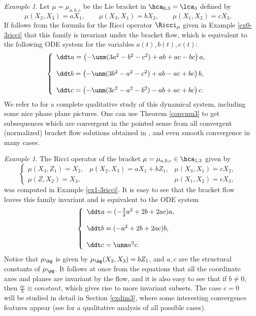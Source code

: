 \documentclass[11pt]{amsart}
\theoremstyle{plain}
\theoremstyle{definition}
\theoremstyle{remark}
\newtheorem{example}[theorem]{Example}
\begin{document}
\begin{example}\label{ex0-3BF}
Let $\mu=\mu_{a,b,c}$ be the Lie bracket in $\hca_{0,3}=\lca_3$ defined by
$$
\mu(X_2,X_3)=aX_1, \qquad \mu(X_3,X_1)=bX_2, \qquad \mu(X_1,X_2)=cX_3.
$$
If follows from the formula for the Ricci operator $\Ricci_\mu$ given in Example \ref{ex0-3ricci} that this family is invariant under the bracket flow, which is equivalent to the following ODE system for the variables $a(t),b(t),c(t)$:
$$
\left\{\begin{array}{l}
\ddt a= \left(-\unm(3a^2-b^2-c^2)+ab+ac-bc\right)a, \\ \\
\ddt b= \left(-\unm(3b^2-a^2-c^2)+ab-ac+bc\right)b,  \\ \\
\ddt c= \left(-\unm(3c^2-a^2-b^2)-ab+ac+bc\right)c.
\end{array}\right.
$$
We refer to \cite{GlcPyn} for a complete qualitative study of this dynamical system, including some nice phase plane pictures.  One can use Theorem \ref{convmu3} to get  subsequences which are convergent in the pointed sense from all convergent (normalized) bracket flow solutions obtained in \cite{GlcPyn}, and even smooth convergence in many cases.
\end{example}



\begin{example}\label{ex1-3BF}
The Ricci operator of the bracket $\mu=\mu_{a,b,c}\in\hca_{1,3}$ given by
$$
\left\{\begin{array}{lll}
\mu(X_3,Z_1)=X_2, & \mu(X_2,X_3)=aX_1+bZ_1, & \mu(X_3,X_1)=cX_2, \\
\mu(Z,X_2)=X_3, &                           & \mu(X_1,X_2)=cX_3,
\end{array}\right.
$$
was computed in Example \ref{ex1-3ricci}.  It is easy to see that the bracket flow leaves this family invariant and is equivalent to the ODE system
$$
\left\{\begin{array}{l}
\ddt a=(-\tfrac{3}{2}a^2+2b+2ac)a, \\ \\
\ddt b=(-a^2+2b+2ac)b, \\ \\
\ddt c=\unm a^2c.
\end{array}\right.
$$
Notice that $\mu_{\kg}$ is given by $\mu_{\kg}(X_2,X_3)=bZ_1$, and $a,c$ are the structural constants of $\mu_{\pg}$.  It follows at once from the equations that all the coordinate axes and planes are invariant by the flow, and it is also easy to see that if $b\ne 0$, then $\frac{ac}{b}\equiv constant$, which gives rise to more invariant subsets.  The case $c=0$ will be studied in detail in Section \ref{exdim3}, where some interesting convergence features appear (see \cite{Arr} for a qualitative analysis of all possible cases).
\end{example}
\end{document}
